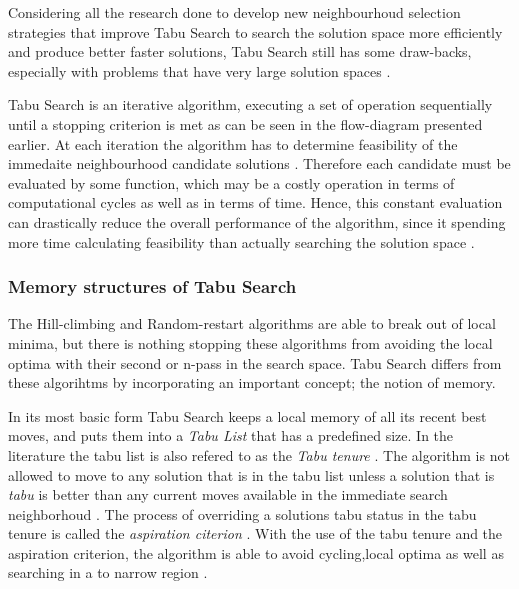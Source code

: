 Considering all the research done to develop new neighbourhoud selection strategies that improve Tabu Search to search the solution space more efficiently and produce better faster solutions, Tabu Search still has some draw-backs, especially with problems that have very large solution spaces \cite{EvoParallelTabu}.

Tabu Search is an iterative algorithm, executing a set of operation sequentially until a stopping criterion is met as can be seen in the flow-diagram presented earlier. At each iteration the algorithm has to determine feasibility of the immedaite neighbourhood candidate solutions \cite{EvoParallelTabu,TabuVechicleRoutingWithTimeWindows}. Therefore each candidate must be evaluated by some function, which may be a costly operation in terms of computational cycles as well as in terms of time. Hence, this constant evaluation can drastically reduce the overall performance of the algorithm, since it spending more time calculating feasibility than actually searching the solution space \cite{EvoParallelTabu,TabuVechicleRoutingWithTimeWindows}.

\subsubsection{Memory structures of Tabu Search}
The Hill-climbing and Random-restart algorithms are able to break out of local minima, but there is nothing stopping these algorithms from avoiding the local optima with their second or n-pass in the search space. Tabu Search differs from these algorihtms by incorporating an important concept; the notion of memory.

In its most basic form Tabu Search keeps a local memory of all its recent best moves, and puts them into a \emph{Tabu List} that has a predefined size. In the literature the tabu list is also refered to as the \emph{Tabu tenure} \cite{TSHazardous,TabuCarryOver,ReactiveTabuVHR,TabuParameterization}. The algorithm is not allowed to move to any solution that is in the tabu list unless a solution that is \emph{tabu} is better than any current moves available in the immediate search neighborhoud \cite{TSHazardous,TabuCarryOver,ReactiveTabuVHR,TabuParameterization}. The process of overriding a solutions tabu status in the tabu tenure is called the \emph{aspiration citerion} \cite{TSHazardous,TabuCarryOver,ReactiveTabuVHR,TabuParameterization}. With the use of the tabu tenure and the aspiration criterion, the algorithm is able to avoid cycling,local optima as well as searching in a to narrow region \cite{TabuSingleMachineScheduling,CircuitTabu}.

